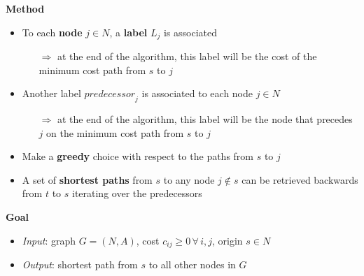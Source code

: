 \documentclass[english]{article}
\begin{document}
\bigskip
\textbf{Method}
\begin{itemize}
  \item To each \textbf{node} \(j \in N\), a \textbf{label} \(L_j\) is associated
        \begin{itemize}
          \item[\(\Rightarrow\)] at the end of the algorithm, this label will be the cost of the minimum cost path from \(s\) to \(j\)
        \end{itemize}
  \item Another label \(\textit{predecessor}_j\) is associated to each node \(j \in N\)
        \begin{itemize}
          \item[\(\Rightarrow\)] at the end of the algorithm, this label will be the node that precedes \(j\) on the minimum cost path from \(s\) to \(j\)
        \end{itemize}
  \item Make a \textbf{greedy} choice with respect to the paths from \(s\) to \(j\)
  \item A set of \textbf{shortest paths} from \(s\) to any node \(j \notin s\) can be retrieved backwards from \(t\) to \(s\) iterating over the predecessors
\end{itemize}

\bigskip
\textbf{Goal}
\begin{itemize}[label=\(\rightarrow\)]
  \item \textit{Input}: graph \(G = (N, A)\), cost \(c_{ij} \geq 0 \, \forall \, i, j\), origin \(s \in N\)
  \item \textit{Output}: shortest path from \(s\) to all other nodes in \(G\)
\end{itemize}
\end{document}
